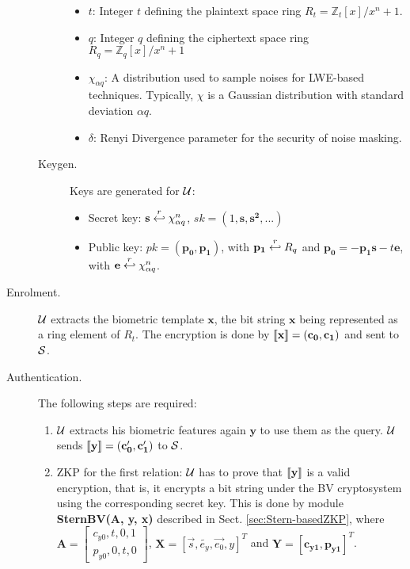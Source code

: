 \begin{description}
\begin{description}
\begin{itemize}
    \item $t$: Integer $t$ defining the plaintext space ring $R_t = \mathbb{Z}_t[x]/x^n+1$.
    \item $q$: Integer $q$ defining the ciphertext space ring $R_q = \mathbb{Z}_q[x]/x^n+1$
    \item $\chi_{\alpha q}$: A distribution used to sample noises for LWE-based techniques.  Typically, $\chi$
      is a Gaussian distribution with standard deviation $\alpha q$.
    \item \(\delta\): Renyi Divergence parameter for the security of noise masking.
    \end{itemize}
  \item[Keygen.] Keys are generated for $\mathcal{U}$:
    \begin{itemize}
    \item Secret key: $\mathbf{s} \stackrel{r}{\hookleftarrow} \chi_{\alpha q}^n$, \(sk = (1, \mathbf{s, s^{2}, ...})\)
    \item Public key: $pk = \mathbf{(p_0,p_1)}$, with $\mathbf{p_1} \stackrel{r}{\hookleftarrow} R_q$ and
      $\mathbf{p_0} = -\mathbf{p_1s} - t\mathbf{e}$, with $\mathbf{e} \stackrel{r}{\hookleftarrow} \chi_{\alpha q}^n$.
    \end{itemize}
  \end{description}
\item [Enrolment.] $\mathcal{U}$ extracts the biometric template $\mathbf{x}$, the bit string $\mathbf{x}$ being
  represented as a ring element of ${R}_t$.  The encryption is done by $\left\llbracket\mathbf{x}\right\rrbracket = (\mathbf{c_0},\mathbf{c_1})$
  and sent to $\mathcal{S}$.
\item [Authentication.] The following steps are required:
  \begin{enumerate}
  \item $\mathcal{U}$ extracts his biometric features again $\mathbf{y}$ to use them as the query. $\mathcal{U}$ sends
    $\left\llbracket\mathbf{y}\right\rrbracket = (\mathbf{c_0', c_1'})$ to $\mathcal{S}$.
  \item ZKP for the first relation: $\mathcal{U}$ has to prove that $\left\llbracket\mathbf{y}\right\rrbracket$ is a valid encryption, that is, it
    encrypts a bit string under the BV cryptosystem using the corresponding secret key. This is done by module
    \textbf{SternBV(A, y, x)} described in Sect. \ref{sec:Stern-basedZKP}, where
    $\mathbf{A} = \begin{bmatrix} c_{y0}, t, 0, 1\\p_{y0}, 0, t, 0
    \end{bmatrix}$, \(\mathbf{X} = [\vec{s},\tilde{e_{y}},\vec{e_{0}},y]^T\) and \(\mathbf{Y
    = [c_{y1},p_{y1}]}^{T}\).


\end{enumerate}
\end{description}
